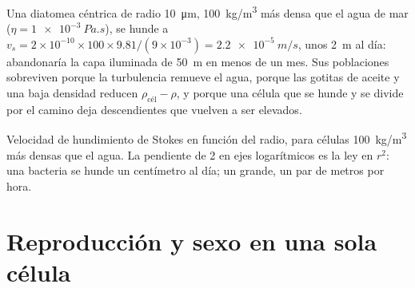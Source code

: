 \begin{example}\label{ex:b2:unicellular-diversity:fall}
Una diatomea céntrica de radio \qty{10}{\micro m}, \qty{100}{kg/m^3}
más densa que el agua de mar ($\eta = \qty{1e-3}{Pa.s}$), se hunde a
$v_s = 2\times 10^{-10}\times 100\times 9.81/(9\times 10^{-3}) =
\qty{2.2e-5}{m/s}$, unos \qty{2}{m} al día: abandonaría la capa iluminada
de \qty{50}{m} en menos de un mes. Sus poblaciones sobreviven porque la
turbulencia remueve el agua, porque las gotitas de aceite y una baja
densidad reducen $\rho_{\text{cél}} - \rho$, y porque una célula que se
hunde y se divide por el camino deja descendientes que vuelven a ser
elevados.
\end{example}

\begin{omfigure}

{\small Velocidad de hundimiento de Stokes en función del radio, para
células \qty{100}{kg/m^3} más densas que el agua. La pendiente de 2 en
ejes logarítmicos es la ley en $r^2$: una bacteria se hunde un
centímetro al día; un  grande, un par de metros por hora.}
\end{omfigure}

\section{Reproducción y sexo en una sola célula}


